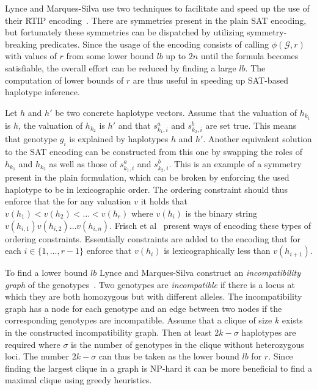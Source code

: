 \documentclass[12pt,a4paper]{article}
\begin{document}
Lynce and Marques-Silva use two techniques to facilitate and speed up the use of their RTIP encoding~\cite{DBLP:conf/aaai/LynceM06}.
There are symmetries present in the plain SAT encoding, but fortunately these symmetries can be dispatched by utilizing symmetry-breaking predicates.
Since the usage of the encoding consists of calling $\phi (\mathcal{G}, r)$ with values of $r$ from some lower bound $lb$ up to $2n$ until the formula becomes satisfiable, the overall effort can be reduced by finding a large $lb$.
The computation of lower bounds of $r$ are thus useful in speeding up SAT-based haplotype inference.

Let $h$ and $h'$ be two concrete haplotype vectors.
Assume that the valuation of $h_{k_1}$ is $h$, the valuation of $h_{k_2}$ is $h'$ and that $s_{k_1, i}^a$ and  $s_{k_2, i}^b$ are set true.
This means that genotype $g_i$ is explained by haplotypes $h$ and $h'$.
Another equivalent solution to the SAT encoding can be constructed from this one by swapping the roles of $h_{k_1}$ and $h_{k_2}$ as well as those of $s_{k_1, i}^a$ and  $s_{k_2, i}^b$.
This is an example of a symmetry present in the plain formulation, 
which can be broken by enforcing the used haplotype to be in lexicographic order.
The ordering constraint should thus enforce that the for any valuation $v$ it holds that $v(h_1) < v(h_2) < \dots < v(h_r)$ where $v(h_i)$ is the binary string $v(h_{i,1})v(h_{i,2})\dots v(h_{i,n})$.
Frisch et al~\cite{DBLP:conf/cp/FrischHKMW02} present ways of encoding these types of ordering constraints.
Essentially constraints are added to the encoding that for each $i\in\{1,\dots ,r-1\}$ enforce that $v(h_i)$ is lexicographically less than $v(h_{i+1})$.

To find a lower bound $lb$ Lynce and Marques-Silva construct an \emph{incompatibility graph} of the genotypes~\cite{DBLP:conf/aaai/LynceM06}.
Two genotypes are \emph{incompatible} if there is a locus at which they are both homozygous but with different alleles.
The incompatibility graph has a node for each genotype and an edge between two nodes if the corresponding genotypes are incompatible.
Assume that a clique of size $k$ exists in the constructed incompatibility graph.
Then at least $2k - \sigma$ haplotypes are required where $\sigma$ is the number of genotypes in the clique without heterozygous loci.
The number $2k-\sigma$ can thus be taken as the lower bound $lb$ for $r$.
Since finding the largest clique in a graph is NP-hard it can be more beneficial to find a maximal clique using greedy heuristics.
\end{document}
